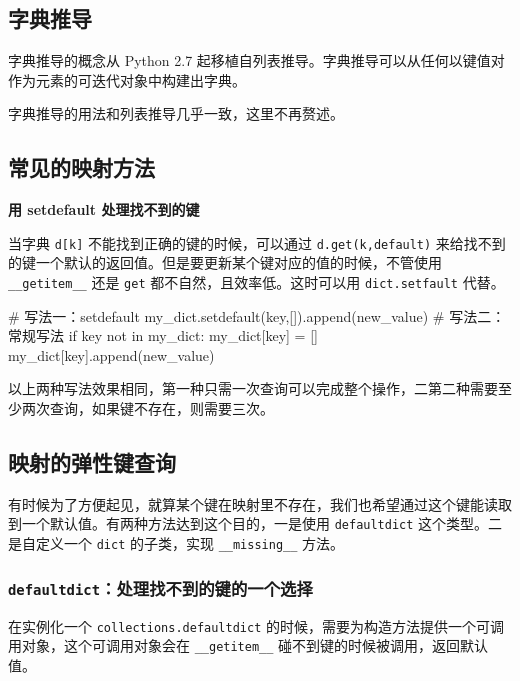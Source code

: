\subsection{字典推导}

字典推导的概念从 Python 2.7 起移植自列表推导。字典推导可以从任何以键值对作为元素的可迭代对象中构建出字典。



字典推导的用法和列表推导几乎一致，这里不再赘述。

\subsection{常见的映射方法}

\noindent \textbf{用 setdefault 处理找不到的键}

当字典 \texttt{d[k]} 不能找到正确的键的时候，可以通过 \texttt{d.get(k,default)} 来给找不到的键一个默认的返回值。但是要更新某个键对应的值的时候，不管使用 \texttt{\_\_getitem\_\_} 还是 \texttt{get} 都不自然，且效率低。这时可以用 \texttt{dict.setfault} 代替。 

\begin{python}
    # 写法一：setdefault
    my_dict.setdefault(key,[]).append(new_value)
    # 写法二：常规写法
    if key not in my_dict:
    my_dict[key] = []
    my_dict[key].append(new_value)
\end{python}

以上两种写法效果相同，第一种只需一次查询可以完成整个操作，二第二种需要至少两次查询，如果键不存在，则需要三次。

\subsection{映射的弹性键查询}

有时候为了方便起见，就算某个键在映射里不存在，我们也希望通过这个键能读取到一个默认值。有两种方法达到这个目的，一是使用 \texttt{defaultdict} 这个类型。二是自定义一个 \texttt{dict} 的子类，实现 \texttt{\_\_missing\_\_} 方法。

\subsubsection{\texttt{defaultdict}：处理找不到的键的一个选择}

在实例化一个 \texttt{collections.defaultdict} 的时候，需要为构造方法提供一个可调用对象，这个可调用对象会在 \texttt{\_\_getitem\_\_} 碰不到键的时候被调用，返回默认值。

